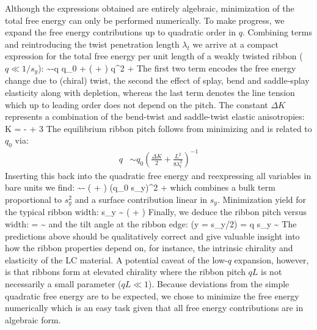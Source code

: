 Although the expressions obtained are entirely algebraic,  minimization of the total free energy can only be performed numerically. To make progress, we  expand the free energy contributions up to quadratic order in $q$.
Combining terms and reintroducing the twist penetration length $\lambda_{t}$ we arrive at a compact expression for the total free energy per unit length of a weakly twisted ribbon ($q \ll 1/s_{y}$): 
\beq
{} \sim   -q q_{0}   +  \left (  + \right )  q^{2} + 
\label{flowq}
\eeq
The first two term encodes the free energy change due to (chiral) twist, the second  the effect of splay, bend and saddle-splay elasticity along with depletion, whereas the last term denotes the line tension which up to leading order does not depend on the pitch.  The constant $\Delta K$ represents a combination of the  bend-twist and saddle-twist elastic anisotropies:
\beq
\Delta K =  -  + 3
\label{dk}
\eeq
The equilibrium ribbon pitch follows from minimizing  and is related to $q_{0}$ via:
\begin{align}
q & \sim q_{0} \left ( \frac{\Delta K}{2} + \frac{L^{2}}{8\lambda_{t}^{2}}\right )^{-1}  
\end{align}
Inserting this back into the quadratic free energy and reexpressing all variables in bare units we find:
\beq
{} \sim - \left (  + \right ) (q_{0} s_{y})^{2} + 
\eeq
which combines a bulk term proportional to $s_{y}^{2}$ and a surface contribution  linear in $s_{y}$. Minimization yield for the typical ribbon width:
\beq
s_{y} \sim {} \left (  + \right ) 
\eeq
Finally, we deduce  the ribbon pitch versus width:
\beq
{} =  \sim  {}
\eeq
and the tilt angle at the ribbon edge:
\beq
\Phi(y = s_{y}/2) =  q s_{y} \sim {}
\eeq
The predictions above should be qualitatively correct and give valuable insight into how the ribbon properties depend on, for instance, the intrinsic chirality and elasticity of the LC material.  A potential caveat of the low-$q$ expansion, however, is that ribbons form at elevated chirality where the ribbon pitch $qL$ is not necessarily a small parameter ($qL \ll 1$). Because deviations from the simple quadratic free energy  are to be expected, we chose to minimize the free energy numerically which is an easy task given that all free energy contributions  are in  algebraic form.

